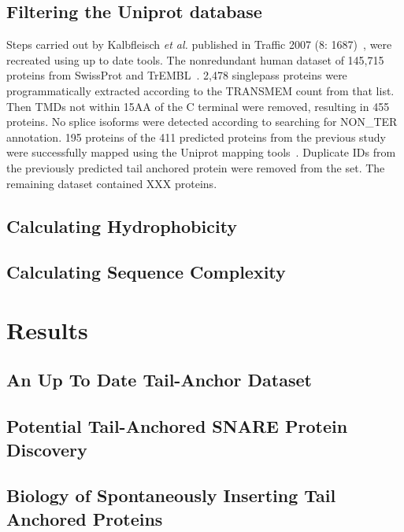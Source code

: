 
\subsection{Filtering the Uniprot database}
Steps carried out by Kalbfleisch \textit{et al.} published in Traffic 2007 (8: 1687)~\cite{Kalbfleisch2007}, were recreated using up to date tools.
The non\-redundant human dataset of 145,715 proteins from SwissProt and TrEMBL~\cite{TheUniProtConsortium2014}.
2,478 singlepass proteins were programmatically extracted according to the TRANSMEM count from that list.
Then TMDs not within 15AA of the C terminal were removed, resulting in 455 proteins.
No splice isoforms were detected according to searching for NON\_TER annotation.
195 proteins of the 411 predicted proteins from the previous study were successfully mapped using the Uniprot mapping tools~\cite{TheUniProtConsortium2014}.
Duplicate IDs from the previously predicted tail anchored protein were removed from the set.
The remaining dataset contained XXX proteins.

\subsection{Calculating Hydrophobicity}

\subsection{Calculating Sequence Complexity}

\section{Results}

\subsection{An Up To Date Tail-Anchor Dataset}

\subsection{Potential Tail-Anchored SNARE Protein Discovery}

\subsection{Biology of Spontaneously Inserting Tail Anchored Proteins}
